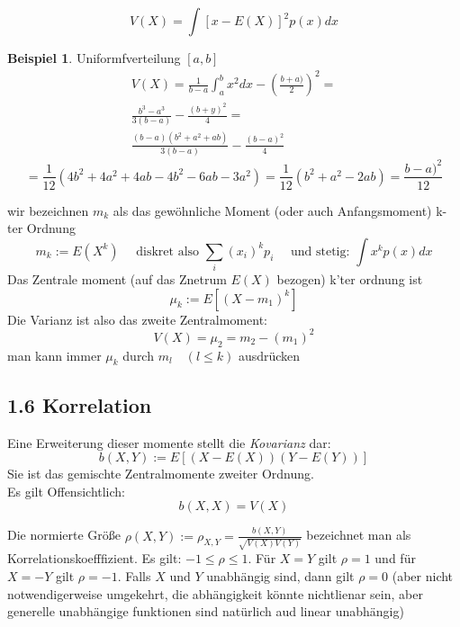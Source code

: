 \documentclass[a4paper]{article}
\theoremstyle{definition}
\newtheorem{beispiel}{Beispiel}
\theoremstyle{remark}
\begin{document}
\begin{equation}
  V(X)=\int\left[ x-E(X) \right]^2p(x)dx
\end{equation}  
  \begin{beispiel}
    Uniformfverteilung $[a,b]$\\
    \begin{multline}
V(X)= \frac{1}{b-a}\int_{a}^{b}x^2dx-\left( \frac{b+a)}{2} \right)^2 =\\
\frac{b^3-a^3}{3(b-a)}-\frac{(b+y)^2}{4}=\\
\frac{(b-a)(b^2+a^2+ab)}{3(b-a)}-\frac{(b-a)^2}{4}
    \end{multline}
  \begin{equation}
  = \frac{1}{12}(4b^2+4a^2+4ab-4b^2-6ab-3a^2)= \frac{1}{12}(b^2+a^2-2ab)=\frac{b-a)^2}{12}
  \end{equation}
  \end{beispiel}
  wir bezeichnen $m_k$ als das gewöhnliche Moment (oder auch Anfangsmoment) k-ter Ordnung
  \begin{equation}
    m_k:= E(X^k) \quad \textrm{ diskret also } \sum_{i}(x_i)^kp_i \quad \textrm{ und stetig: } \int x^k p(x)dx
  \end{equation}
  Das Zentrale moment (auf das Znetrum $E(X)$ bezogen) k'ter ordnung ist 
  \begin{equation}
    \mu_k:= E\left[ \left( X-m_1 \right)^k \right]
  \end{equation}
Die Varianz ist also das zweite Zentralmoment:
\begin{equation}
V(X)=\mu_2=m_2-(m_1)^2
\end{equation}
man kann immer $\mu_k$ durch $m_l\quad (l\leq k)$ ausdrücken

\subsection{1.6 Korrelation}
\label{sub:1_6_korrelation}

Eine Erweiterung dieser momente stellt die \textit{Kovarianz} dar:
\begin{equation}
b(X,Y):= E\left[ \left( X-E(X) \right)\left( Y-E(Y) \right) \right]
\end{equation}
Sie ist das gemischte Zentralmomente zweiter Ordnung.\\
Es gilt Offensichtlich:
\begin{equation}
  b(X,X)=V(X)
\end{equation}

Die normierte Größe $\rho (X,Y):= \rho _{X,Y}=\frac{b(X,Y)}{\sqrt{V(X)V(Y)}}$ bezeichnet man als Korrelationskoefffizient. Es gilt:
$ -1\leq\rho \leq 1$. Für $X=Y$ gilt $\rho =1$ und für $X=-Y$ gilt $\rho =-1$. Falls $X$ und $Y$ unabhängig sind, dann gilt $\rho =0$ (aber nicht notwendigerweise umgekehrt, die abhängigkeit könnte nichtlienar sein, aber generelle unabhängige funktionen sind natürlich aud linear unabhängig)\\
\end{document}
